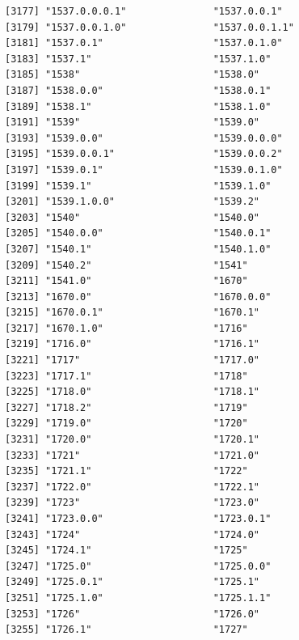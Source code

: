 \documentclass[
  letterpaper,
  DIV=11,
  numbers=noendperiod]{scrreprt}
\begin{document}
\begin{verbatim}
[3177] "1537.0.0.0.1"               "1537.0.0.1"                
[3179] "1537.0.0.1.0"               "1537.0.0.1.1"              
[3181] "1537.0.1"                   "1537.0.1.0"                
[3183] "1537.1"                     "1537.1.0"                  
[3185] "1538"                       "1538.0"                    
[3187] "1538.0.0"                   "1538.0.1"                  
[3189] "1538.1"                     "1538.1.0"                  
[3191] "1539"                       "1539.0"                    
[3193] "1539.0.0"                   "1539.0.0.0"                
[3195] "1539.0.0.1"                 "1539.0.0.2"                
[3197] "1539.0.1"                   "1539.0.1.0"                
[3199] "1539.1"                     "1539.1.0"                  
[3201] "1539.1.0.0"                 "1539.2"                    
[3203] "1540"                       "1540.0"                    
[3205] "1540.0.0"                   "1540.0.1"                  
[3207] "1540.1"                     "1540.1.0"                  
[3209] "1540.2"                     "1541"                      
[3211] "1541.0"                     "1670"                      
[3213] "1670.0"                     "1670.0.0"                  
[3215] "1670.0.1"                   "1670.1"                    
[3217] "1670.1.0"                   "1716"                      
[3219] "1716.0"                     "1716.1"                    
[3221] "1717"                       "1717.0"                    
[3223] "1717.1"                     "1718"                      
[3225] "1718.0"                     "1718.1"                    
[3227] "1718.2"                     "1719"                      
[3229] "1719.0"                     "1720"                      
[3231] "1720.0"                     "1720.1"                    
[3233] "1721"                       "1721.0"                    
[3235] "1721.1"                     "1722"                      
[3237] "1722.0"                     "1722.1"                    
[3239] "1723"                       "1723.0"                    
[3241] "1723.0.0"                   "1723.0.1"                  
[3243] "1724"                       "1724.0"                    
[3245] "1724.1"                     "1725"                      
[3247] "1725.0"                     "1725.0.0"                  
[3249] "1725.0.1"                   "1725.1"                    
[3251] "1725.1.0"                   "1725.1.1"                  
[3253] "1726"                       "1726.0"                    
[3255] "1726.1"                     "1727"                      

\end{verbatim}
\end{document}
